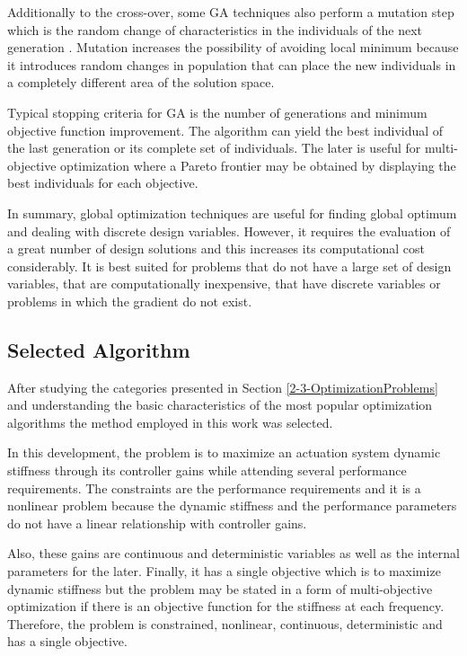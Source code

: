 Additionally to the cross-over, some GA techniques also perform a mutation step which is the random change of characteristics in the individuals of the next generation \cite{Messac}. Mutation increases the possibility of avoiding local minimum because it introduces random changes in population that can place the new individuals in a completely different area of the solution space.

Typical stopping criteria for GA is the number of generations and minimum objective function improvement. The algorithm can yield the best individual of the last generation or its complete set of individuals. The later is useful for multi-objective optimization where a Pareto frontier may be obtained by displaying the best individuals for each objective.

In summary, global optimization techniques are useful for finding global optimum and dealing with discrete design variables. However, it requires the evaluation of a great number of design solutions and this increases its computational cost considerably. It is best suited for problems that do not have a large set of design variables, that are computationally inexpensive, that have discrete variables or problems in which the gradient do not exist.

\subsection{Selected Algorithm} \label{2-4-3-SelectedAlgorithm}

After studying the categories presented in Section \ref{2-3-OptimizationProblems} and understanding the basic characteristics of the most popular optimization algorithms the method employed in this work was selected. 

In this development, the problem is to maximize an actuation system dynamic stiffness through its controller gains while attending several performance requirements. The constraints are the performance requirements and it is a nonlinear problem because the dynamic stiffness and the performance parameters do not have a linear relationship with controller gains. 

Also, these gains are continuous and deterministic variables as well as the internal parameters for the later. Finally, it has a single objective which is to maximize dynamic stiffness but the problem may be stated in a form of multi-objective optimization if there is an objective function for the stiffness at each frequency. Therefore, the problem is constrained, nonlinear, continuous, deterministic and has a single objective.

